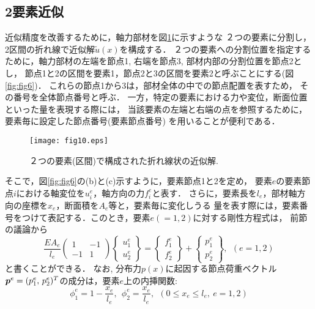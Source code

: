 \documentclass[10pt,a4j]{jarticle}
\begin{document}
\subsection{2要素近似}
近似精度を改善するために，軸力部材を図\ref{fig:fig10}に示すような
２つの要素に分割し，2区間の折れ線で近似解$\tilde u(x)$を構成する．
２つの要素への分割位置を指定するために，軸力部材の左端を節点1, 
右端を節点3, 部材内部の分割位置を節点2とし，
節点1と2の区間を要素1，節点2と3の区間を要素2と呼ぶことにする(図\ref{fig:fig6})．
これらの節点1から3は，部材全体の中での節点配置を表すため，
その番号を全体節点番号と呼ぶ．
一方，特定の要素における力や変位，断面位置といった量を表現する際には，
当該要素の左端と右端の点を参照するために，要素毎に設定した節点番号(要素節点番号)
を用いることが便利である．
\begin{figure}[h]
	\begin{center}
	\texttt{[image: fig10.eps]} 
	\end{center}
	\caption{２つの要素(区間)で構成された折れ線状の近似解.} 
	\label{fig:fig10}
\end{figure}
そこで，図\ref{fig:fig6}の(b)と(c)示すように，要素節点1と2を定め，
要素$e$の要素節点$i$における軸変位を$u^e_i$，軸方向の力$f^e_i$と表す．
さらに，要素長を$l_e$，部材軸方向の座標を$x_e$，断面積を$A_e$等と，要素毎に変化しうる
量を表す際には，要素番号をつけて表記する．このとき，要素$e(=1,2)$に対する剛性方程式は，
前節の議論から
\begin{equation}
	\frac{EA_e}{l_e}
	\left(
	\begin{array}{cc}
		1 & -1  \\
		-1 & 1 
	\end{array}
	\right)
	\left\{
	\begin{array}{c}
		u^e_1 \\
		u^e_2
	\end{array}
	\right\}
	=
	\left\{
	\begin{array}{c}
		f^e_1  \\
		f^e_2 
	\end{array}
	\right\}
	+
	\left\{
	\begin{array}{c}
		p^e_1 \\
		p^e_2 
	\end{array}
	\right\}, 
	\ \ 
	(e=1,2)
	\label{eqn:fe_eq_e}
\end{equation}
と書くことができる．
なお, 分布力$p(x)$に起因する節点荷重ベクトル$\mbox{\boldmath $p$}^e=(p^e_1,\, p^e_2)^T$の成分は，要素$e$上の内挿関数:
\begin{equation}
	\phi^e_1=1-\frac{x_e}{l_e}, \ \ 
	\phi^e_2=\frac{x_e}{l_e}, \ \ (0\leq x_e \leq l_e, \ e=1,2)
	\label{eqn:phi_e_i}
\end{equation}
\end{document}
